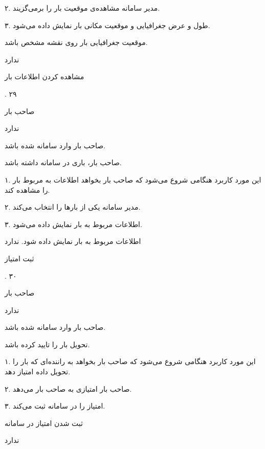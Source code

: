 ۲. مدیر سامانه مشاهده‌ی موقعیت بار را برمی‌گزیند.

۳. طول و عرض جغرافیایی و موقعیت مکانی بار نمایش داده می‌شود.

موقعیت جغرافیایی بار روی نقشه مشخص باشد.

ندارد

\noindent \hrulefill

مشاهده کردن اطلاعات بار

.
۲۹

صاحب بار

ندارد

صاحب بار وارد سامانه شده باشد.

صاحب بار، باری در سامانه داشته باشد.


۱. این مورد کاربرد هنگامی شروع می‌شود که صاحب بار بخواهد اطلاعات به مربوط بار را مشاهده کند.

۲. مدیر سامانه یکی از بارها را انتخاب می‌کند.

۳. اطلاعات مربوط به بار نمایش داده می‌شود.

اطلاعات مربوط به بار نمایش داده شود.
ندارد

\noindent \hrulefill

ثبت امتیاز

.
۳۰

صاحب بار

ندارد


صاحب بار وارد سامانه شده باشد.

تحویل بار را تایید کرده باشد.


۱. این مورد کاربرد هنگامی شروع می‌شود که صاحب بار بخواهد به راننده‌ای که بار را تحویل داده امتیاز دهد.

۲. صاحب بار امتیازی به صاحب بار می‌دهد.

۳. امتیاز را در سامانه ثبت می‌کند.

ثبت شدن امتیاز در سامانه

ندارد

\noindent \hrulefill